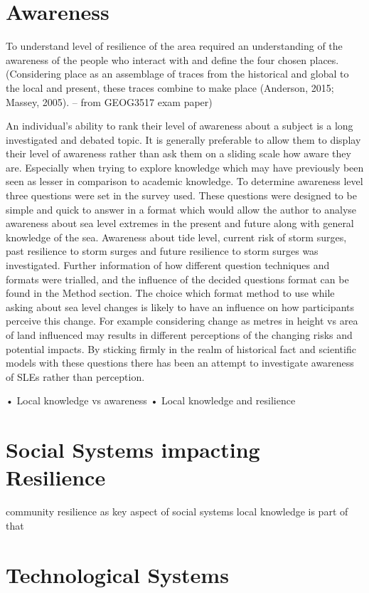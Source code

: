 \documentclass{article}
\begin{document}
\section{Awareness}
To understand level of resilience of the area required an understanding of the awareness of the people who interact with and define the four chosen places. (Considering place as an assemblage of traces from the historical and global to the local and present, these traces combine to make place (Anderson, 2015; Massey, 2005). – from GEOG3517 exam paper)

An individual’s ability to rank their level of awareness about a subject is a long investigated and debated topic. It is generally preferable to allow them to display their level of awareness rather than ask them on a sliding scale how aware they are. Especially when trying to explore knowledge which may have previously been seen as lesser in comparison to academic knowledge. 
To determine awareness level three questions were set in the survey used. These questions were designed to be simple and quick to answer in a format which would allow the author to analyse awareness about sea level extremes in the present and future along with general knowledge of the sea. 
Awareness about tide level, current risk of storm surges, past resilience to storm surges and future resilience to storm surges was investigated. Further information of how different question techniques and formats were trialled, and the influence of the decided questions format can be found in the Method section. The choice which format method to use while asking about sea level changes is likely to have an influence on how participants perceive this change. For example considering change as metres in height vs area of land influenced may results in different perceptions of the changing risks and potential impacts.  By sticking firmly in the realm of historical fact and scientific models with these questions there has been an attempt to investigate awareness of SLEs rather than perception. 

•	Local knowledge vs awareness
•	Local knowledge and resilience 

\section{Social Systems impacting Resilience}
community resilience as key aspect of social systems
local knowledge is part of that

\section{Technological Systems}
\end{document}
